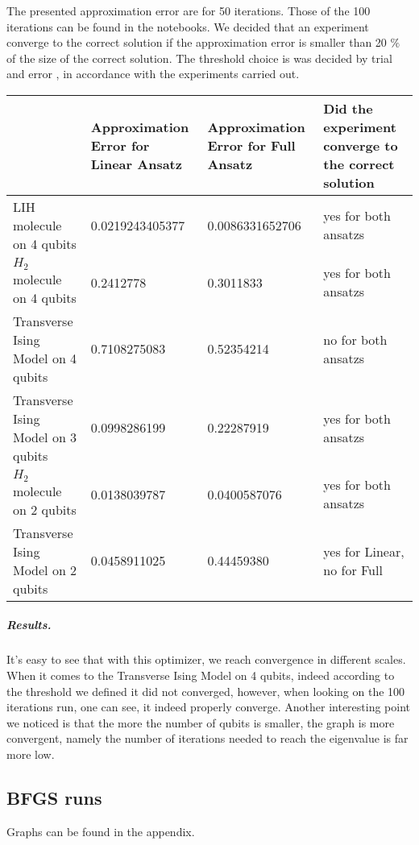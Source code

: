\documentclass[12pt, a4paper]{article}
\begin{document}
    The presented approximation error are for 50 iterations. Those of the 100 iterations can be found in the notebooks. We decided that an experiment converge to the correct solution if the approximation error is smaller than 20 $\%$ of the size of the correct solution. The threshold choice is was decided by trial and error , in accordance with the experiments carried out.


    \begin{tabular}{|p{3cm}|p{3cm}|p{3cm}|p{3cm}|}
        \hline
        & Approximation Error for Linear Ansatz & Approximation Error for Full Ansatz & Did the experiment converge to the correct solution   \\   \hline\hline
        LIH molecule on 4 qubits & 0.0219243405377 & 0.0086331652706 & yes for both ansatzs\\  \hline
        $H_2$ molecule on 4 qubits & 0.2412778 & 0.3011833 &  yes for both ansatzs\\  \hline
        Transverse Ising Model on 4 qubits & 0.7108275083 & 0.52354214 & no for both ansatzs \\  \hline
        Transverse Ising Model on 3 qubits & 0.0998286199 & 0.22287919 & yes for both ansatzs\\  \hline
        $H_2$ molecule on 2 qubits & 0.0138039787 & 0.0400587076 & yes for both ansatzs\\  \hline
        Transverse Ising Model on 2 qubits & 0.0458911025 & 0.44459380 & yes for Linear, no for Full\\
        \hline
    \end{tabular}

    \subparagraph{Results.}
    \label{sec:cobyla_convergence}
    It's easy to see that with this optimizer, we reach convergence in different scales. When it comes to the Transverse Ising Model on 4 qubits, indeed according to the threshold we defined it did not converged, however, when looking on the 100 iterations run, one can see, it indeed properly converge.
    Another interesting point we noticed is that the more the number of qubits is smaller, the graph is more convergent, namely the number of iterations needed to reach the eigenvalue is far more low.

    \subsection{BFGS runs}
    Graphs can be found in the appendix.
\end{document}
